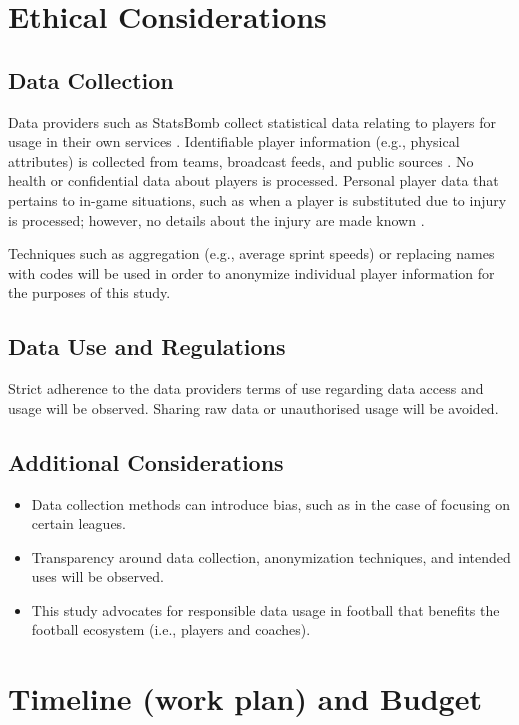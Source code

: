 \documentclass[12pt]{article}
\begin{document}
\section{Ethical Considerations}
\subsection{Data Collection}
Data providers such as StatsBomb collect statistical data relating to players for usage in their own services \cite{statsbombprivacy}. Identifiable player information (e.g., physical attributes) is collected from teams, broadcast feeds, and public sources \cite{statsbombprivacy}. No health or confidential data about players is processed. Personal player data that pertains to in-game situations, such as when a player is substituted due to injury is processed; however, no details about the injury are made known \cite{statsbombprivacy}.

Techniques such as aggregation (e.g., average sprint speeds) or replacing names with codes will be used in order to anonymize individual player information for the purposes of this study. 

\subsection{Data Use and Regulations}
Strict adherence to the data providers terms of use regarding data access and usage will be observed. Sharing raw data or unauthorised usage will be avoided.

\subsection{Additional Considerations}
\begin{itemize}
    \item Data collection methods can introduce bias, such as in the case of focusing on certain leagues.
    \item Transparency around data collection, anonymization techniques, and intended uses will be observed.
    \item This study advocates for responsible data usage in football that benefits the football ecosystem (i.e., players and coaches).
\end{itemize}

\section{Timeline (work plan) and Budget}
\end{document}
